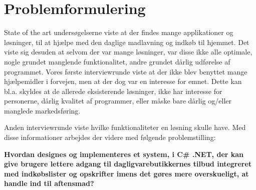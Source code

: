 \section{Problemformulering}\label{section:problemformulering}

State of the art undersøgelserne viste at der findes mange applikationer og løsninger, til at hjælpe med den daglige madlavning og indkøb til hjemmet.
Det viste sig desuden at selvom der var mange løsninger, var disse ikke alle optimale, nogle grundet manglende funktionalitet, andre grundet dårlig udførelse af programmet.
Vores første interviewrunde viste at der ikke blev benyttet mange hjælpemidler i forvejen, men at der dog var en interesse for emnet.
Dette kan bl.a. skyldes at de allerede eksisterende løsninger, ikke har interesse for personerne, dårlig kvalitet af programmer, eller måske bare dårlig og/eller manglede markedsføring. 

Anden interviewrunde viste hvilke funktionaliteter en løsning skulle have.
Med disse informationer arbejdes der videre med følgende problemstilling:


\textbf{Hvordan designes og implementeres et system, i C\# .NET, der kan give brugere lettere adgang til dagligvarebutikkernes tilbud integreret med indkøbslister og opskrifter imens det gøres mere overskueligt, at handle ind til aftensmad? }

